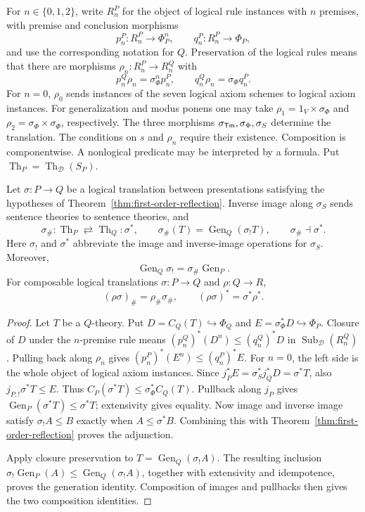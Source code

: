 For $n\in\{0,1,2\}$, write $R_n^P$ for the object of logical
rule instances with $n$ premises, with premise and conclusion morphisms
\[
 p_n^P:R_n^P\to\Phi_P^n,\qquad q_n^P:R_n^P\to\Phi_P,
\]
and use the corresponding notation for $Q$.
Preservation of the logical rules means that there are morphisms
$\rho_n:R_n^P\to R_n^Q$ with
\[
 p_n^Q\rho_n=\sigma_{\Phi}^{n}p_n^P,\qquad
 q_n^Q\rho_n=\sigma_{\Phi}q_n^P.
\]
For $n=0$, $\rho_0$ sends instances of the seven logical axiom
schemes to logical axiom instances. For generalization and modus ponens
one may take $\rho_1=1_V\times\sigma_\Phi$ and
$\rho_2=\sigma_\Phi\times\sigma_\Phi$, respectively.
The three morphisms $\sigma_{\mathsf{Tm}},\sigma_\Phi,\sigma_S$ determine the
translation. The conditions on $s$ and $\rho_n$ require their existence.
Composition is componentwise. A nonlogical predicate
may be interpreted by a formula. Put
$\operatorname{Th}_P=\operatorname{Th}_{\mathcal D}(S_P)$.

\begin{theorem}\label{thm:translation-galois}
Let $\sigma:P\to Q$ be a logical translation between presentations
satisfying the hypotheses of
Theorem~\ref{thm:first-order-reflection}. Inverse image along
$\sigma_S$ sends sentence theories to sentence theories, and
\[
 \sigma_\#:\operatorname{Th}_P\rightleftarrows
 \operatorname{Th}_Q:\sigma^*,\qquad
 \sigma_\#(T)=\operatorname{Gen}_Q(\sigma_!T),\qquad
 \sigma_\#\dashv\sigma^*.
\]
Here $\sigma_!$ and $\sigma^*$ abbreviate the image and inverse-image
operations for $\sigma_S$. Moreover,
\[
 \operatorname{Gen}_Q\sigma_!
   =\sigma_\#\operatorname{Gen}_P.
\]
For composable logical translations $\sigma:P\to Q$ and
$\rho:Q\to R$,
\[
 (\rho\sigma)_\#=\rho_\#\sigma_\#,\qquad
 (\rho\sigma)^*=\sigma^*\rho^*.
\]
\end{theorem}
\begin{proof}
Let $T$ be a $Q$-theory. Put $D=C_Q(T)\hookrightarrow\Phi_Q$ and
$E=\sigma_\Phi^*D\hookrightarrow\Phi_P$. Closure of $D$ under the
$n$-premise rule means $(p_n^Q)^*(D^n)\leq(q_n^Q)^*D$ in
$\operatorname{Sub}_{\mathcal D}(R_n^Q)$. Pulling back along $\rho_n$
gives $(p_n^P)^*(E^n)\leq(q_n^P)^*E$. For $n=0$, the left side is
the whole object of logical axiom instances. Since
$j_P^*E=\sigma_S^* j_Q^*D=\sigma^*T$, also $j_{P,!}\sigma^*T\leq E$. Thus
$C_P(\sigma^*T)\leq\sigma_{\Phi}^*C_Q(T)$.
Pullback along $j_P$ gives
$\operatorname{Gen}_P(\sigma^*T)\leq\sigma^*T$;
extensivity gives equality. Now image and inverse image satisfy
$\sigma_!A\leq B$ exactly when $A\leq\sigma^*B$.
Combining this with Theorem~\ref{thm:first-order-reflection}
proves the adjunction.

Apply closure preservation to
$T=\operatorname{Gen}_Q(\sigma_!A)$. The resulting inclusion
$\sigma_!\operatorname{Gen}_P(A)
\leq\operatorname{Gen}_Q(\sigma_!A)$, together with extensivity
and idempotence, proves the generation identity. Composition of
images and pullbacks then gives the two composition identities.
\end{proof}

